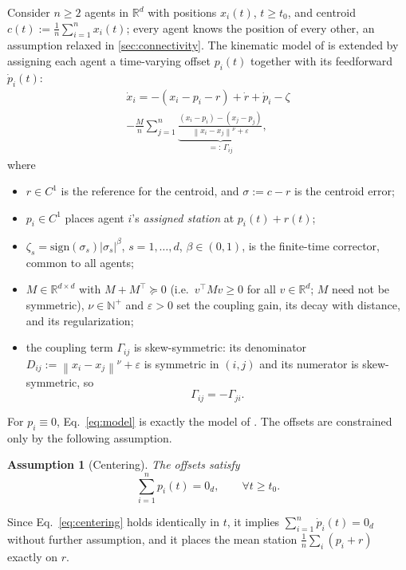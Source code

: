 \documentclass[letterpaper, 10 pt, conference]{ieeeconf}
\newcommand{\R}{\mathbb{R}}
\newcommand{\norm}[1]{\left\lVert #1 \right\rVert}
\newcommand{\abs}[1]{\left\lvert #1 \right\rvert}
\newtheorem{assumption}{Assumption}
\begin{document}
Consider $n\ge2$ agents in $\R^d$ with positions $x_i(t)$, $t\ge t_0$,
and centroid $c(t):=\frac1n\sum_{i=1}^n x_i(t)$; every agent knows the
position of every other, an assumption relaxed in \cref{sec:connectivity}.
The kinematic model of \cite{fedele2019kinematic} is extended by
assigning each agent a time-varying offset $p_i(t)$ together with its
feedforward $\dot p_i(t)$:
\begin{multline}
\dot x_i = -(x_i-p_i-r)+\dot r+\dot p_i-\zeta\\
-\frac{M}{n}\sum_{j=1}^n\underbrace{\frac{(x_i-p_i)-(x_j-p_j)}
{\norm{x_i-x_j}^\nu+\varepsilon}}_{=:\,\Gamma_{ij}},
\label{eq:model}
\end{multline}
where
\begin{itemize}
\item $r\in C^1$ is the reference for the centroid, and
      $\sigma:=c-r$ is the centroid error;
\item $p_i\in C^1$ places agent $i$'s \emph{assigned station} at
      $p_i(t)+r(t)$;
\item $\zeta_s=\mathrm{sign}(\sigma_s)\abs{\sigma_s}^\beta$,
      $s=1,\dots,d$, $\beta\in(0,1)$, is the finite-time corrector,
      common to all agents;
\item $M\in\R^{d\times d}$ with $M+M^\top\succeq0$ (i.e.\
      $v^\top Mv\ge0$ for all $v\in\R^d$; $M$ need not be symmetric),
      $\nu\in\mathbb{N}^+$ and $\varepsilon>0$ set the coupling gain,
      its decay with distance, and its regularization;
\item the coupling term $\Gamma_{ij}$ is skew-symmetric: its
      denominator $D_{ij}:=\norm{x_i-x_j}^\nu+\varepsilon$ is symmetric
      in $(i,j)$ and its numerator is skew-symmetric, so
      \begin{equation}
      \Gamma_{ij}=-\Gamma_{ji}.
      \label{eq:skewGamma}
      \end{equation}
\end{itemize}
For $p_i\equiv0$, Eq.~\eqref{eq:model} is exactly the model of
\cite[eq.~(1)]{fedele2019kinematic}. The offsets are constrained only
by the following assumption.
\begin{assumption}[Centering]
\label{ass:centering}
The offsets satisfy
\begin{equation}
\sum_{i=1}^n p_i(t)=0_d,\qquad\forall t\ge t_0.
\label{eq:centering}
\end{equation}
\end{assumption}
Since Eq.~\eqref{eq:centering} holds identically in $t$, it implies
$\sum_{i=1}^n\dot p_i(t)=0_d$ without further assumption, and it
places the mean station $\frac1n\sum_i(p_i+r)$ exactly on $r$.
\end{document}
